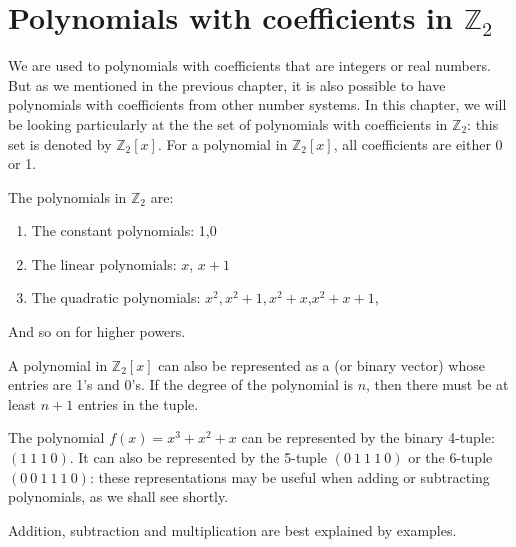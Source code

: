 

\section{Polynomials with coefficients in $\mathbb{Z}_2$}\label{sec:polycodes:1}
We are used to polynomials with coefficients that are integers or real numbers. But as we mentioned in the previous chapter, it is also possible to have polynomials with coefficients from other number systems. In this chapter, we will be looking particularly 
at the the set of polynomials with coefficients in  $\mathbb{Z}_2$: this set is denoted by $\mathbb{Z}_2[x]$.
For a polynomial in $\mathbb{Z}_2[x]$, all coefficients are either 0 or 1.

\begin{example}{}
The polynomials in $\mathbb{Z}_2$ are:
\begin{enumerate}[.]
\item
The constant polynomials: 1,0
\item
The linear polynomials: $x$, $x+1$
\item
The quadratic polynomials: $x^2, x^2+1, x^2 + x$,$x^2 + x+1$,
\end {enumerate}
And so on for higher powers.
\end {example}
A polynomial in $\mathbb{Z}_2[x]$ can also be represented as a  (or binary vector) whose entries are 1's and 0's. If the degree of the polynomial is $n$, then there must be at least $n+1$ entries in the tuple.

\begin{example}{}
The polynomial $f(x) = x^3 + x^2 + x $ can be represented by the binary 4-tuple: $(1~1~1~0)$.  It can also be represented by the 5-tuple $(0~1~1~1~0)$ or the 6-tuple $(0~0~1~1~1~0)$: these representations may be useful when adding or subtracting polynomials, as we shall see shortly.
\end{example}

Addition, subtraction and multiplication are best explained by examples.


